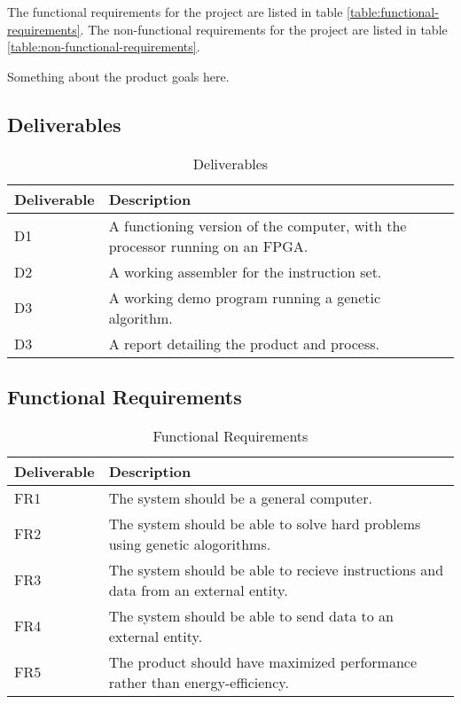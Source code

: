 
The functional requirements for the project are listed in table \vref{table:functional-requirements}. The non-functional requirements for the project are listed in table \vref{table:non-functional-requirements}.


Something about the product goals here.

 \subsection{Deliverables}

 \begin{table}
 \begin{center}
 \begin{tabular}{| l | l |}
 \hline
 Deliverable & Description \\
 \hline
 D1 & A functioning version of the computer, with the processor running on an FPGA.\\
 D2 & A working assembler for the instruction set.\\
 D3 & A working demo program running a genetic algorithm.\\
 D3 & A report detailing the product and process.\\
 \hline
 \end{tabular}
 \caption{Deliverables}
 \label{table:deliverables}
 \end{center}
 \end{table}

 \subsection{Functional Requirements}

 \begin{table}
 \begin{center}
 \begin{tabular}{| l | l |}
 \hline
 Deliverable & Description \\
 \hline
 FR1 & The system should be a general computer.\\
 FR2 & The system should be able to solve hard problems using genetic alogorithms.\\
 FR3 & The system should be able to recieve instructions and data from an external entity.\\
 FR4 & The system should be able to send data to an external entity.\\
 FR5 & The product should have maximized performance rather than energy-efficiency. \\
 \hline
 \end{tabular}
 \caption{Functional Requirements}
 \label{table:functional-requirements}
 \end{center}
 \end{table}

